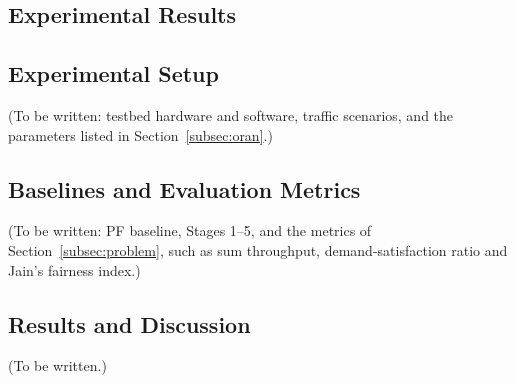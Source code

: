 \begin{EnChapter}

\chapter{Experimental Results}
\label{chap:experiments}


\section{Experimental Setup}

(To be written: testbed hardware and software, traffic scenarios, and the
parameters listed in Section~\ref{subsec:oran}.)

\section{Baselines and Evaluation Metrics}

(To be written: PF baseline, Stages 1--5, and the metrics of
Section~\ref{subsec:problem}, such as sum throughput, demand-satisfaction ratio and
Jain's fairness index.)

\section{Results and Discussion}

(To be written.)

\end{EnChapter}
